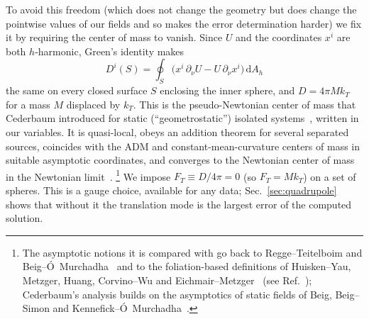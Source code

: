 \documentclass[aps,prd,twocolumn,superscriptaddress, nofootinbib,floatfix]{revtex4-2}
\newcommand{\dd}{\mathrm{d}}
\begin{document}
To avoid this freedom (which does not change the geometry but does change the pointwise values of our fields and so makes the error determination harder) we fix it by requiring the center of mass to vanish.
Since $U$ and the coordinates $x^i$ are both $h$-harmonic, Green's identity makes
\begin{equation}
  D^i(S) = \oint_S\bigl(x^i\,\partial_\nu U - U\,\partial_\nu x^i\bigr)\,\dd A_h
  \label{eq:comflux}
\end{equation}
the same on every closed surface $S$ enclosing the inner sphere, and $D = 4\pi M k_T$ for a mass $M$ displaced by $k_T$.
This is the pseudo-Newtonian center of mass that Cederbaum introduced for static (``geometrostatic'') isolated systems~\cite{Cederbaum2012}, written in our variables.
It is quasi-local, obeys an addition theorem for several separated sources, coincides with the ADM and constant-mean-curvature centers of mass in suitable asymptotic coordinates, and converges to the Newtonian center of mass in the Newtonian limit~\cite{Cederbaum2012,CederbaumNerz2015}.
\footnote{The asymptotic notions it is compared with go back to Regge--Teitelboim and Beig--\'O~Murchadha~\cite{ReggeTeitelboim1974,BeigOMurchadha1987} and to the foliation-based definitions of Huisken--Yau, Metzger, Huang, Corvino--Wu and Eichmair--Metzger~\cite{HuiskenYau1996,Metzger2007,Huang2009,Huang2010,CorvinoWu2008,EichmairMetzger2012} (see Ref.~\cite{CorvinoPollack2011}); Cederbaum's analysis builds on the asymptotics of static fields of Beig, Beig--Simon and Kennefick--\'O~Murchadha~\cite{Beig1980,BeigSimon1980,KennefickOMurchadha1995}.} We impose $F_T \equiv D/4\pi = 0$ (so $F_T = M k_T$) on a set of spheres.
This is a gauge choice, available for any data; Sec.~\ref{sec:quadrupole} shows that without it the translation mode is the largest error of the computed solution.
\end{document}
